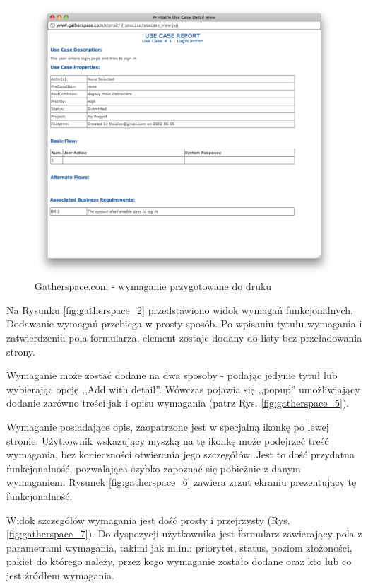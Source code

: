         \begin{figure}[t]
          \centering
          \includegraphics[width=1.0\textwidth]{img/gatherspace_9.pdf}
          \caption{Gatherspace.com - wymaganie przygotowane do druku}
          \label{fig:gatherspace_9}
        \end{figure}

        Na Rysunku \ref{fig:gatherspace_2} przedstawiono widok wymagań funkcjonalnych. Dodawanie wymagań przebiega w prosty sposób. Po wpisaniu tytułu wymagania i zatwierdzeniu pola formularza, element zostaje dodany do listy bez przeładowania strony.

        Wymaganie może zostać dodane na dwa sposoby - podając jedynie tytuł lub wybierając opcję ,,Add with detail''. Wówczas pojawia się ,,popup'' umożliwiający dodanie zarówno treści jak i opisu wymagania (patrz Rys. \ref{fig:gatherspace_5}).

        Wymaganie posiadające opis, zaopatrzone jest w specjalną ikonkę po lewej stronie. Użytkownik wskazujący myszką na tę ikonkę może podejrzeć treść wymagania, bez konieczności otwierania jego szczegółów. Jest to dość przydatna funkcjonalność, pozwalająca szybko zapoznać się pobieżnie z danym wymaganiem. Rysunek \ref{fig:gatherspace_6} zawiera zrzut ekraniu prezentujący tę funkcjonalność. 
        
        Widok szczegółów wymagania jest dość prosty i przejrzysty (Rys. \ref{fig:gatherspace_7}). Do dyspozycji użytkownika jest formularz zawierający pola z parametrami wymagania, takimi jak m.in.: priorytet, status, poziom złożoności, pakiet do którego należy, przez kogo wymaganie zostało dodane oraz kto lub co jest źródłem wymagania.

